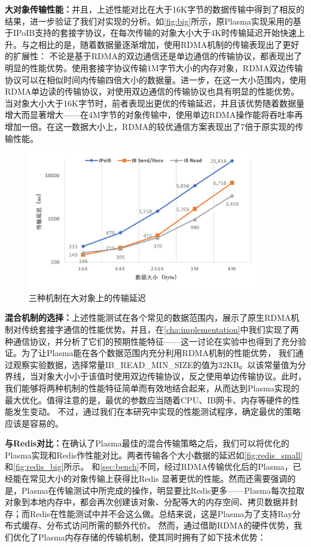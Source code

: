 \textbf{大对象传输性能：}并且，上述性能对比在大于16K字节的数据传输中得到了相反的结果，进一步验证了我们对实现的分析。如\autoref{fig:big}所示，原Plasma实现采用的基于IPoIB支持的套接字协议，在每次传输的对象大小大于4K时传输延迟开始快速上升。与之相比的是，随着数据量逐渐增加，使用RDMA机制的传输表现出了更好的扩展性：
不论是基于RDMA的双边通信还是单边通信的传输协议，都表现出了明显的性能优势。使用套接字协议传输1M字节大小的内存对象，RDMA双边传输协议可以在相似时间内传输四倍大小的数据量。进一步，在这一大小范围内，使用RDMA单边读的传输协议，对使用双边通信的传输协议也具有明显的性能优势。
当对象大小大于16K字节时，前者表现出更优的传输延迟，并且该优势随着数据量增大而显著增大——在4M字节的对象传输中，使用单边RDMA操作能将吞吐率再增加一倍。在这一数据大小上，RDMA的较优通信方案表现出了7倍于原实现的传输性能。

\begin{figure}[h]
	\centering
	\includegraphics[width=0.9\textwidth]{image/chap04/big.png}
	\caption{三种机制在大对象上的传输延迟}
	\label{fig:big}
\end{figure}

\textbf{混合机制的选择：}上述性能测试在各个常见的数据范围内，展示了原生RDMA机制对传统套接字通信的性能优势。并且，在\autoref{cha:implementation}中我们实现了两种通信协议，并分析了它们的预期性能特征——这一讨论在实验中也得到了充分验证。为了让Plasma能在各个数据范围内充分利用RDMA机制的性能优势，
我们通过观察实验数据，选择常量IB\_READ\_MIN\_SIZE的值为32KB。以该常量值为分界线，当对象大小小于该值时使用双边传输协议，反之使用单边传输协议。此时，我们能够将两种机制的性能特征简单而有效地结合起来，从而达到Plasma实现的最大优化。值得注意的是，最优的参数应当随着CPU、IB网卡、内存等硬件的性能发生变动。
不过，通过我们在本研究中实现的性能测试程序，确定最优的策略应该是容易的。

\textbf{与Redis对比：}在确认了Plasma最佳的混合传输策略之后，我们可以将优化的Plasma实现和Redis作性能对比。两者传输各个大小数据的延迟如\autoref{fig:redis_small}和\autoref{fig:redis_big}所示。
和\autoref{sec:bench}不同，经过RDMA传输优化后的Plasma，已经能在常见大小的对象传输上获得比Redis
显著更优的性能。然而还需要强调的是，Plasma在传输测试中所完成的操作，明显要比Redis更多——Plasma每次拉取对象到本地内存中，都会再次创建该对象、分配等大的内存空间、拷贝数据并封存；而Redis在性能测试中并不会这么做。总结来说，这是Plasma为了支持Ray分布式缓存、分布式访问所需的额外代价。
然而，通过借助RDMA的硬件优势，我们优化了Plasma内存存储的传输机制，使其同时拥有了如下技术优势：

